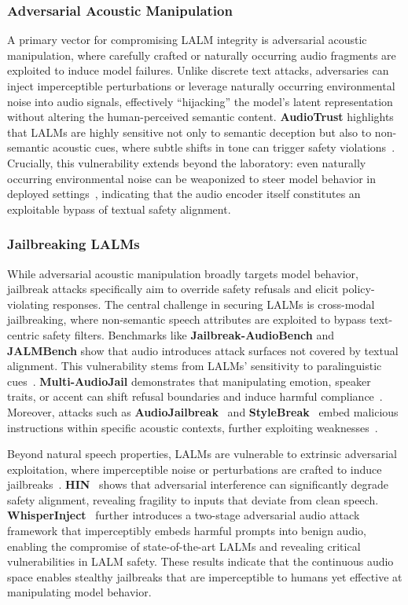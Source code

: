 \subsubsection{Adversarial Acoustic Manipulation}
A primary vector for compromising LALM integrity is adversarial acoustic manipulation, where carefully crafted or naturally occurring audio fragments are exploited to induce model failures.
Unlike discrete text attacks, adversaries can inject imperceptible perturbations or leverage naturally occurring environmental noise into audio signals, effectively ``hijacking'' the model's latent representation without altering the human-perceived semantic content. \textbf{AudioTrust} highlights that LALMs are highly sensitive not only to semantic deception but also to non-semantic acoustic cues, where subtle shifts in tone can trigger safety violations~\cite{li2025audiotrust}. Crucially, this vulnerability extends beyond the laboratory: even naturally occurring environmental noise can be weaponized to steer model behavior in deployed settings~\cite{sadasivan2025attacker}, indicating that the audio encoder itself constitutes an exploitable bypass of textual safety alignment.


\subsubsection{Jailbreaking LALMs}

While adversarial acoustic manipulation broadly targets model behavior, jailbreak attacks specifically aim to override safety refusals and elicit policy-violating responses. The central challenge in securing LALMs is cross-modal jailbreaking, where non-semantic speech attributes are exploited to bypass text-centric safety filters. Benchmarks like \textbf{Jailbreak-AudioBench} and \textbf{JALMBench} show that audio introduces attack surfaces not covered by textual alignment. This vulnerability stems from LALMs’ sensitivity to paralinguistic cues~\cite{cheng2025jailbreak, peng2025jalmbench, hou2025evaluating}. \textbf{Multi-AudioJail} demonstrates that manipulating emotion, speaker traits, or accent can shift refusal boundaries and induce harmful compliance~\cite{roh2025multilingual}. Moreover, attacks such as \textbf{AudioJailbreak}~\cite{chen2025audiojailbreak} and \textbf{StyleBreak}~\cite{li2025stylebreak} embed malicious instructions within specific acoustic contexts, further exploiting weaknesses~\cite{feng2025investigating}.

Beyond natural speech properties, LALMs are vulnerable to extrinsic adversarial exploitation, where imperceptible noise or perturbations are crafted to induce jailbreaks~\cite{song2025audio}. \textbf{HIN}~\cite{lin2025hidden} shows that adversarial interference can significantly degrade safety alignment, revealing fragility to inputs that deviate from clean speech. \textbf{WhisperInject}~\cite{kim2025good} further introduces a two-stage adversarial audio attack framework that imperceptibly embeds harmful prompts into benign audio, enabling the compromise of state-of-the-art LALMs and revealing critical vulnerabilities in LALM safety.
These results indicate that the continuous audio space enables stealthy jailbreaks that are imperceptible to humans yet effective at manipulating model behavior.

